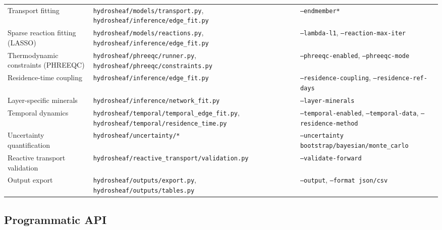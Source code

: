 \documentclass[12pt,a4paper]{article}
\theoremstyle{plain}
\theoremstyle{definition}
\theoremstyle{remark}
\begin{document}
\begin{table}[htbp]
\begin{tabular}{p{} p{} p{}}
		Transport fitting                    & \texttt{hydrosheaf/models/transport.py}, \texttt{hydrosheaf/inference/edge\_fit.py}                  & \texttt{--endmember*}                                                              \\
		Sparse reaction fitting (LASSO)      & \texttt{hydrosheaf/models/reactions.py}, \texttt{hydrosheaf/inference/edge\_fit.py}                  & \texttt{--lambda-l1}, \texttt{--reaction-max-iter}                                 \\
		Thermodynamic constraints (PHREEQC)  & \texttt{hydrosheaf/phreeqc/runner.py}, \texttt{hydrosheaf/phreeqc/constraints.py}                    & \texttt{--phreeqc-enabled}, \texttt{--phreeqc-mode}                                \\
		Residence-time coupling              & \texttt{hydrosheaf/inference/edge\_fit.py}                                                           & \texttt{--residence-coupling}, \texttt{--residence-ref-days}                       \\
		Layer-specific minerals              & \texttt{hydrosheaf/inference/network\_fit.py}                                                        & \texttt{--layer-minerals}                                                          \\
		Temporal dynamics                    & \texttt{hydrosheaf/temporal/temporal\_edge\_fit.py}, \texttt{hydrosheaf/temporal/residence\_time.py} & \texttt{--temporal-enabled}, \texttt{--temporal-data}, \texttt{--residence-method} \\
		Uncertainty quantification           & \texttt{hydrosheaf/uncertainty/*}                                                                    & \texttt{--uncertainty bootstrap/bayesian/monte\_carlo}                             \\
		Reactive transport validation        & \texttt{hydrosheaf/reactive\_transport/validation.py}                                                & \texttt{--validate-forward}                                                        \\
		Output export                        & \texttt{hydrosheaf/outputs/export.py}, \texttt{hydrosheaf/outputs/tables.py}                         & \texttt{--output}, \texttt{--format json/csv}                                      \\
		\bottomrule
	\end{tabular}
\end{table}

\subsection{Programmatic API}
\end{document}
